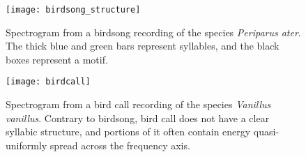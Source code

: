 \documentclass[../main.tex]{subfiles} \label{chapter_soa}
\begin{document}
\begin{figure}[t]
\texttt{[image: birdsong\_structure]}
\caption{Spectrogram from a birdsong recording of the species \emph{Periparus ater}. The thick blue and green bars represent syllables, and the black boxes represent a motif.}
\label{fig_birdsong_structure}
\end{figure}


\begin{figure}[t]
\texttt{[image: birdcall]}
\caption{Spectrogram from a bird call recording of the species \emph{Vanillus vanillus}. Contrary to birdsong, bird call does not have a clear syllabic structure, and portions of it often contain energy quasi-uniformly spread across the frequency axis.}
\label{fig_birdcall}
\end{figure}
\end{document}
